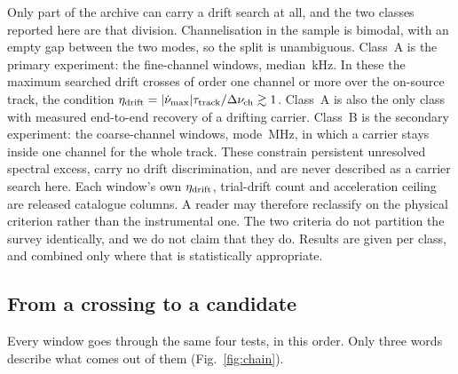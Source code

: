 Only part of the archive can carry a drift search at all, and the two
classes reported here are that division. Channelisation in the sample is
bimodal, with an empty gap between the two modes, so the split is
unambiguous. Class~A is the primary experiment: the \NWinA{} fine-channel
windows, median \ChanAMedKHz\,kHz. In these the maximum searched drift
crosses of order one channel or more over the on-source track, the
condition $\eta_{\rm drift} =
|\dot\nu_{\max}|\tau_{\rm track}/\Delta\nu_{\rm ch} \gtrsim 1$. Class~A
is also the only class with measured end-to-end recovery of a drifting
carrier. Class~B is the secondary experiment: the \NWinB{} coarse-channel
windows, mode \ChanBModeMHz\,MHz, in which a carrier stays inside one
channel for the whole track. These constrain persistent unresolved
spectral excess, carry no drift discrimination, and are never described
as a carrier search here. Each window's own $\eta_{\rm drift}$,
trial-drift count and acceleration ceiling are released catalogue
columns. A reader may therefore reclassify on the physical criterion
rather than the instrumental one. The two criteria do not partition the
survey identically, and we do not claim that they do. Results are given
per class, and combined only where that is statistically appropriate.

\subsection{From a crossing to a candidate}
\label{sec:summary}

Every window goes through the same four tests, in this order. Only three
words describe what comes out of them (Fig.~\ref{fig:chain}).

